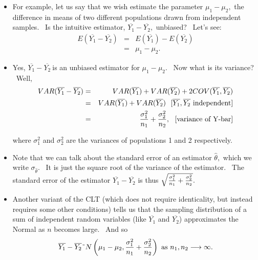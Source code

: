 \documentclass[11pt]{article}
\begin{document}
\begin{itemize}
\item For example, let us say that we wish estimate the parameter $\mu
_{1}-\mu _{2},$ the difference in means of two different populations drawn
from independent samples. \ Is the intuitive estimator, $\overline{Y_{1}}-%
\overline{Y_{2}},$ unbiased? \ Let's see:%
\begin{eqnarray*}
E(\overline{Y_{1}}-\overline{Y_{2}}) &=&E(\overline{Y_{1}})-E(\overline{Y_{2}%
}) \\
&=&\mu _{1}-\mu _{2}.
\end{eqnarray*}

\item Yes, $\overline{Y_{1}}-\overline{Y_{2}}\ $is an unbiased estimator for 
$\mu _{1}-\mu _{2}.$ \ Now what is its variance? \ Well,%
\begin{eqnarray*}
VAR(\overline{Y_{1}}-\overline{Y_{2}}) &=&VAR(\overline{Y_{1}})+VAR(%
\overline{Y_{2}})+2COV(\overline{Y_{1}},\overline{Y_{2}}) \\
&=&VAR(\overline{Y_{1}})+VAR(\overline{Y_{2}})\text{ \ [}\overline{Y_{1}},%
\overline{Y_{2}}\text{ independent]} \\
&=&\frac{\sigma _{1}^{2}}{n_{1}}+\frac{\sigma _{2}^{2}}{n_{2}},\text{ \
[variance of Y-bar]}
\end{eqnarray*}

where $\sigma _{1}^{2}$ and $\sigma _{2}^{2}$ are the variances of
populations 1 and 2 respectively.

\item Note that we can talk about the standard error of an estimator $%
\widehat{\theta },$ which we write $\sigma _{\widehat{\theta }}.$ \ It is
just the square root of the variance of the estimator. \ The standard error
of the estimator $\overline{Y_{1}}-\overline{Y_{2}}$ is thus $\sqrt{\frac{%
\sigma _{1}^{2}}{n_{1}}+\frac{\sigma _{2}^{2}}{n_{2}}}.$

\item Another variant of the CLT (which does not require identicality, but
instead requires some other conditions) tells us that the sampling
distribution of a sum of independent random variables (like $\overline{Y_{1}}
$ and $\overline{Y_{2}}$) approximates the Normal as $n$ becomes large. \
And so 
\begin{equation*}
\overline{Y_{1}}-\overline{Y_{2}}\symbol{126}N\left( \mu _{1}-\mu _{2},\frac{%
\sigma _{1}^{2}}{n_{1}}+\frac{\sigma _{2}^{2}}{n_{2}}\right) \text{ as }%
n_{1},n_{2}\longrightarrow \infty .
\end{equation*}
\end{itemize}
\end{document}
